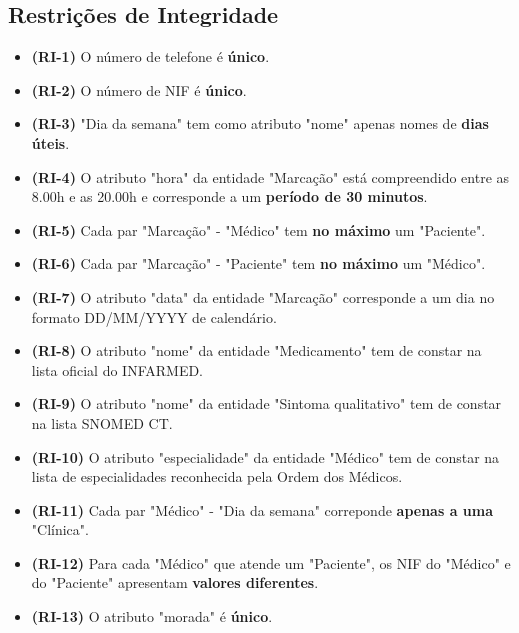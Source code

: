 \documentclass[12pt,a4paper]{article}
\begin{document}
  \subsection*{Restrições de Integridade}
  \footnotesize
  \begin{itemize}
    \item \textbf{(RI-1)} O número de telefone é \textbf{único}.
    \item \textbf{(RI-2)} O número de NIF é \textbf{único}.
    \item \textbf{(RI-3)} "Dia da semana" tem como atributo "nome" apenas nomes de \textbf{dias úteis}.
    \item \textbf{(RI-4)} O atributo "hora" da entidade "Marcação" está compreendido entre as 8.00h e as 20.00h e corresponde a um \textbf{período de 30 minutos}.
    \item \textbf{(RI-5)}  Cada par "Marcação" - "Médico" tem \textbf{no máximo} um "Paciente".
    \item \textbf{(RI-6)} Cada par "Marcação" - "Paciente" tem \textbf{no máximo} um "Médico".
    \item \textbf{(RI-7)} O atributo "data" da entidade "Marcação" corresponde a um dia no formato DD/MM/YYYY de calendário.
    \item \textbf{(RI-8)} O atributo "nome" da entidade "Medicamento" tem de constar na lista oficial do INFARMED.
    \item \textbf{(RI-9)} O atributo "nome" da entidade "Sintoma qualitativo" tem de constar na lista SNOMED CT.
    \item \textbf{(RI-10)} O atributo "especialidade" da entidade "Médico" tem de constar na lista de especialidades reconhecida pela Ordem dos Médicos.
    \item \textbf{(RI-11)} Cada par "Médico" - "Dia da semana" correponde \textbf{apenas a uma} "Clínica".
    \item \textbf{(RI-12)} Para cada "Médico" que atende um "Paciente", os NIF do "Médico" e do "Paciente" apresentam \textbf{valores diferentes}.
    \item \textbf{(RI-13)} O atributo "morada" é \textbf{único}.
  \end{itemize}
\end{document}
